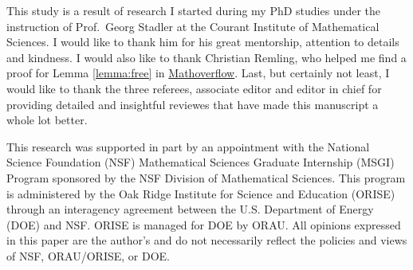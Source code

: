 \documentclass[ba]{imsart}
\theoremstyle{plain}
\theoremstyle{definition}
\theoremstyle{remark}
\begin{document}






%


\begin{acks}[Acknowledgments]
  This study is a result of research I started during my PhD studies
  under the instruction of Prof.~Georg Stadler at the Courant
  Institute of Mathematical Sciences. I would like to thank him for
  his great mentorship, attention to details and kindness. I would
  also like to thank Christian Remling, who helped me find a proof for
  Lemma \ref{lemma:free} in
  \href{https://mathoverflow.net/questions/280168/redistribute-diagonal-entries-of-a-matrix/280203#280203c}{Mathoverflow}.
  Last, but certainly not least, I would like to thank the three
  referees, associate editor and editor in chief for providing
  detailed and insightful reviewes that have made this manuscript a
  whole lot better.

  
  This research was supported in part by an appointment with the
  National Science Foundation (NSF) Mathematical Sciences Graduate
  Internship (MSGI) Program sponsored by the NSF Division of
  Mathematical Sciences. This program is administered by the Oak Ridge
  Institute for Science and Education (ORISE) through an interagency
  agreement between the U.S. Department of Energy (DOE) and NSF. ORISE
  is managed for DOE by ORAU. All opinions expressed in this paper are
  the author's and do not necessarily reflect the policies and views
  of NSF, ORAU/ORISE, or DOE.
\end{acks}



\end{document}
